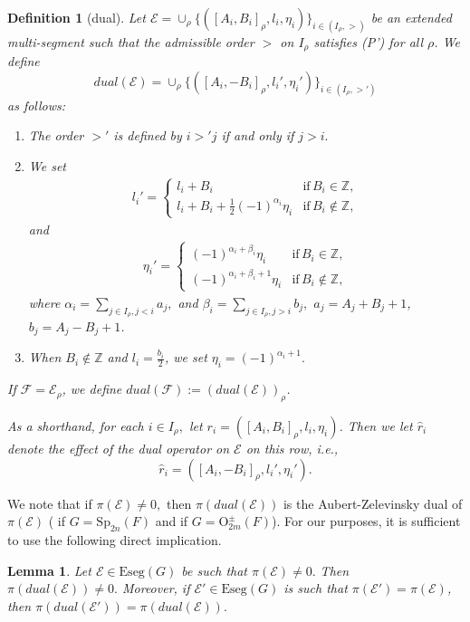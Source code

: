 \documentclass[11pt,letterpaper]{amsart}
\newcommand{\Eseg}{{\mathrm{Eseg}}}
\newcommand{\OO}{\mathrm{O}}
\newcommand{\Sp}{\mathrm{Sp}}
\newcommand{\EE}{\mathcal{E}}
\newcommand{\FF}{\mathcal{F}}
\newtheorem{lemma}[thm]{Lemma}
\newtheorem{defn}[thm]{Definition}
\numberwithin{equation}{section}
\begin{document}
\begin{defn}[dual]\label{def dual}
Let $\EE= \cup_\rho \{([A_i,B_i]_{\rho},l_i,\eta_i)\}_{i\in (I_\rho, >)}$ be an extended multi-segment such that the admissible order $>$ on $I_{\rho}$ satisfies (P') for all $\rho$. We define 
$$dual(\EE)=\cup_{\rho}\{([A_i,-B_i]_{\rho},l_i',\eta_i')\}_{i\in (I_\rho, >')}$$ as follows:
\begin{enumerate}
    \item The order $>'$ is defined by $i>'j$ if and only if $j>i.$ 
    \item We set \begin{align*}
l_i'=\begin{cases}
l_i+B_i  & \mathrm{if} \, B_i\in\mathbb{Z},\\
 l_i+B_i+\frac{1}{2}(-1)^{\alpha_{i}}\eta_i  & \mathrm{if} \, B_i\not\in\mathbb{Z},
\end{cases}
\end{align*}
and
\begin{align*}
\eta_i'=\begin{cases}
(-1)^{\alpha_i+\beta_i}\eta_i  & \mathrm{if} \, B_i\in\mathbb{Z},\\
 (-1)^{\alpha_i+\beta_i+1}\eta_i  & \mathrm{if} \, B_i\not\in\mathbb{Z},
\end{cases}
\end{align*}
where $\alpha_{i}=\sum_{j\in I_\rho, j<i}a_j,$ and $\beta_{i}=\sum_{j\in I_\rho, j>i}b_j,$ $a_j=A_j+B_j+1$, $b_j=A_j-B_j+1$.
\item When $B_i\not\in\mathbb{Z}$ and $l_i=\frac{b_i}{2}$, we set $\eta_i=(-1)^{\alpha_i+1}.$
\end{enumerate}
If $\FF= \EE_{\rho}$, we define $dual(\FF):= (dual(\EE))_{\rho}$.

As a shorthand, for each $i\in I_{\rho},$ let $r_i=([A_i,B_i]_{\rho},l_i,\eta_i)$. Then we let $\widehat{r}_i$ denote the effect of the dual operator on $\EE$ on this row, i.e., 
\[
\widehat{r}_i=([A_i,-B_i]_{\rho},l_i',\eta_i').\]
\end{defn} 

We note that if $\pi(\EE)\neq 0,$ then $\pi(dual(\EE))$ is the Aubert-Zelevinsky dual of $\pi(\EE)$ (\cite[Theorem 6.2]{Ato20b} if $G=\Sp_{2n}(F)$ and \cite[Proposition 6.11]{HLL25} if $G=\OO_{2m}^\pm(F)$). For our purposes, it is sufficient to use the following direct implication.

\begin{lemma}\label{lemma dual}
    Let $\EE\in\Eseg(G)$ be such that $\pi(\EE)\neq 0.$ Then $\pi(dual(\EE))\neq 0.$ Moreover, if $\EE'\in\Eseg(G)$ is such that $\pi(\EE')=\pi(\EE)$, then $\pi(dual(\EE'))=\pi(dual(\EE)).$
\end{lemma}
\end{document}
